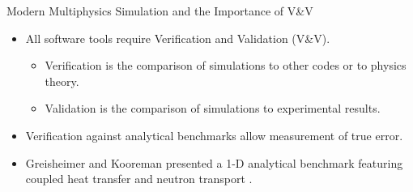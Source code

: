 \documentclass[9pt,t]{beamer}
\begin{document}
\begin{frame}{Modern Multiphysics Simulation and the Importance of V\&V}
    \pause
    \begin{itemize}
        \item <2-> All software tools require Verification and Validation (V\&V).
        \begin{itemize}
            \item <3-> Verification is the comparison of simulations to other codes or to physics theory.
            \item <4-> Validation is the comparison of simulations to experimental results.
        \end{itemize}
        \item <5-> Verification against analytical benchmarks allow measurement of true error.
        \item <6-> Greisheimer and Kooreman presented a 1-D analytical benchmark featuring coupled heat transfer and neutron transport \cite{analytical-benchmark}.
    \end{itemize}
\end{frame}


\end{document}

